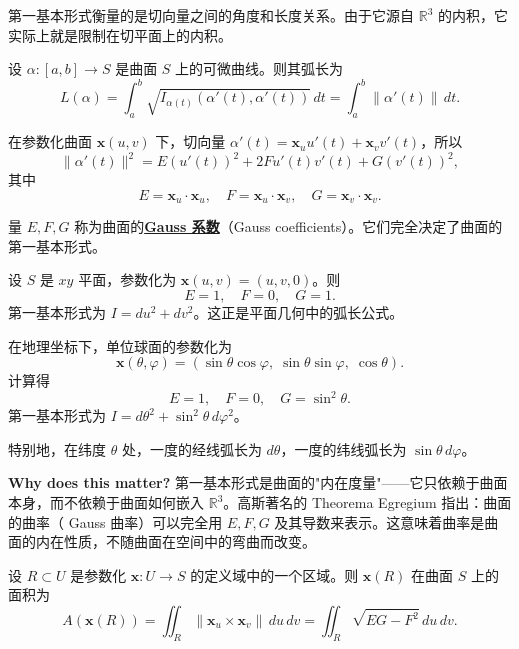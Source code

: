 第一基本形式衡量的是切向量之间的角度和长度关系。由于它源自 $\mathbb{R}^3$ 的内积，它实际上就是限制在切平面上的内积。

\begin{Proposition}[弧长公式]\label{prop:arc-length-first-form}
设 $\alpha: [a,b] \to S$ 是曲面 $S$ 上的可微曲线。则其弧长为
\[
L(\alpha) = \int_a^b \sqrt{I_{\alpha(t)}(\alpha'(t), \alpha'(t))} \, dt = \int_a^b \|\alpha'(t)\| \, dt.
\]
\end{Proposition}

在参数化曲面 $\mathbf{x}(u,v)$ 下，切向量 $\alpha'(t) = \mathbf{x}_u u'(t) + \mathbf{x}_v v'(t)$，所以
\[
\|\alpha'(t)\|^2 = E(u'(t))^2 + 2F u'(t) v'(t) + G(v'(t))^2,
\]
其中
\[
E = \mathbf{x}_u \cdot \mathbf{x}_u,\quad F = \mathbf{x}_u \cdot \mathbf{x}_v,\quad G = \mathbf{x}_v \cdot \mathbf{x}_v.
\]

\begin{Definition}[Gauss 系数]\label{def:gauss-coefficients}
量 $E, F, G$ 称为曲面的\textbf{\underline{Gauss 系数}}（Gauss coefficients）。它们完全决定了曲面的第一基本形式。
\end{Definition}

\begin{Example}[平面]\label{ex:plane-first-form}
设 $S$ 是 $xy$ 平面，参数化为 $\mathbf{x}(u,v) = (u,v,0)$。则
\[
E = 1,\quad F = 0,\quad G = 1.
\]
第一基本形式为 $I = du^2 + dv^2$。这正是平面几何中的弧长公式。
\end{Example}

\begin{Example}[球面]\label{ex:sphere-first-form}
在地理坐标下，单位球面的参数化为
\[
\mathbf{x}(\theta,\varphi) = (\sin\theta\cos\varphi,\; \sin\theta\sin\varphi,\; \cos\theta).
\]
计算得
\[
E = 1,\quad F = 0,\quad G = \sin^2\theta.
\]
第一基本形式为 $I = d\theta^2 + \sin^2\theta\, d\varphi^2$。

特别地，在纬度 $\theta$ 处，一度的经线弧长为 $d\theta$，一度的纬线弧长为 $\sin\theta\, d\varphi$。
\end{Example}

\textbf{Why does this matter?} 第一基本形式是曲面的"内在度量"——它只依赖于曲面本身，而不依赖于曲面如何嵌入 $\mathbb{R}^3$。高斯著名的 Theorema Egregium 指出：曲面的曲率（ Gauss 曲率）可以完全用 $E, F, G$ 及其导数来表示。这意味着曲率是曲面的内在性质，不随曲面在空间中的弯曲而改变。

\begin{Proposition}[曲面的面积]\label{prop:surface-area}
设 $R \subset U$ 是参数化 $\mathbf{x}: U \to S$ 的定义域中的一个区域。则 $\mathbf{x}(R)$ 在曲面 $S$ 上的面积为
\[
A(\mathbf{x}(R)) = \iint_R \|\mathbf{x}_u \times \mathbf{x}_v\| \, du\, dv = \iint_R \sqrt{EG - F^2}\, du\, dv.
\]
\end{Proposition}

